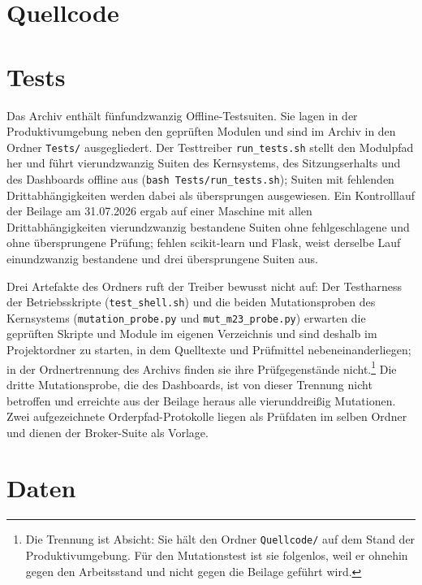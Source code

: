 \section{Quellcode}
\label{sec:anhang-archiv-quellcode}



\section{Tests}
\label{sec:anhang-archiv-tests}

Das Archiv enthält fünfundzwanzig Offline-Testsuiten. Sie lagen in der
Produktivumgebung neben den geprüften Modulen und sind im Archiv in den Ordner
\texttt{Tests/} ausgegliedert. Der Testtreiber
\texttt{run\_tests.sh} stellt den Modulpfad her und führt vierundzwanzig Suiten
des Kernsystems, des Sitzungserhalts und des Dashboards offline aus
(\texttt{bash Tests/run\_tests.sh}); Suiten mit fehlenden Drittabhängigkeiten
werden dabei als übersprungen ausgewiesen. Ein Kontrolllauf der Beilage am
31.07.2026 ergab auf einer Maschine mit allen Drittabhängigkeiten
vierundzwanzig bestandene Suiten ohne fehlgeschlagene und ohne übersprungene
Prüfung; fehlen scikit-learn und Flask, weist derselbe Lauf einundzwanzig
bestandene und drei übersprungene Suiten aus.

Drei Artefakte des Ordners ruft der Treiber bewusst nicht auf: Der Testharness
der Betriebsskripte (\texttt{test\_shell.sh}) und die beiden Mutationsproben
des Kernsystems (\texttt{mutation\_probe.py} und \texttt{mut\_m23\_probe.py})
erwarten die geprüften Skripte und Module im eigenen Verzeichnis und sind
deshalb im Projektordner zu starten, in dem Quelltexte und Prüfmittel
nebeneinanderliegen; in der Ordnertrennung des Archivs finden sie ihre
Prüfgegenstände nicht.\footnote{Die Trennung ist Absicht: Sie hält den Ordner
\texttt{Quellcode/} auf dem Stand der Produktivumgebung. Für den Mutationstest
ist sie folgenlos, weil er ohnehin gegen den Arbeitsstand und nicht gegen die
Beilage geführt wird.} Die dritte Mutationsprobe, die des Dashboards, ist von
dieser Trennung nicht betroffen und erreichte aus der Beilage heraus alle
vierunddreißig Mutationen. Zwei aufgezeichnete Orderpfad-Protokolle liegen als
Prüfdaten im selben Ordner und dienen der Broker-Suite als Vorlage.



\section{Daten}
\label{sec:anhang-archiv-daten}

